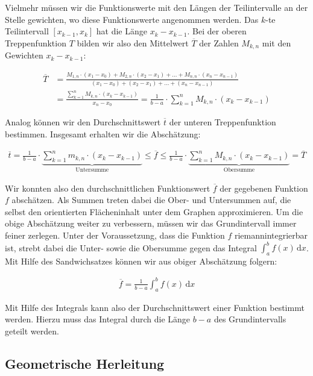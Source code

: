 \documentclass[fontsize=9pt,
               parskip=half-,
               DIV=14,
               listof=chapterentry,
               tocflat]{scrbook}
\begin{document}
Vielmehr müssen wir die Funktionswerte mit den Längen der Teilintervalle an der Stelle gewichten, wo diese Funktionswerte angenommen werden. Das $k$-te Teilintervall $[x_{k-1},x_{k}]$ hat die Länge $x_{k}-x_{k-1}$. Bei der oberen Treppenfunktion $T$ bilden wir also den Mittelwert ${\overline {T}}$ der Zahlen $M_{k,n}$ mit den Gewichten $x_{k}-x_{k-1}$:

\begin{align*}
{\overline {T}}&={\frac {M_{1,n}\cdot (x_{1}-x_{0})+M_{2,n}\cdot (x_{2}-x_{1})+\ldots +M_{n,n}\cdot (x_{n}-x_{n-1})}{(x_{1}-x_{0})+(x_{2}-x_{1})+\ldots +(x_{n}-x_{n-1})}}\\[0.5em]&={\frac {\sum _{k=1}^{n}M_{k,n}\cdot (x_{k}-x_{k-1})}{x_{n}-x_{0}}}={\frac {1}{b-a}}\cdot \sum _{k=1}^{n}M_{k,n}\cdot (x_{k}-x_{k-1})
\end{align*}

Analog können wir den Durchschnittswert ${\overline {t}}$ der unteren Treppenfunktion bestimmen. Insgesamt erhalten wir die Abschätzung:

\begin{align*}
{\overline {t}}={\frac {1}{b-a}}\cdot \underbrace {\sum _{k=1}^{n}m_{k,n}\cdot (x_{k}-x_{k-1})} _{\text{Untersumme}}\leq {\overline {f}}\leq {\frac {1}{b-a}}\cdot \underbrace {\sum _{k=1}^{n}M_{k,n}\cdot (x_{k}-x_{k-1})} _{\text{Obersumme}}={\overline {T}}
\end{align*}

Wir konnten also den durchschnittlichen Funktionswert ${\overline {f}}$ der gegebenen Funktion $f$ abschätzen. Als Summen treten dabei die Ober- und Untersummen auf, die selbst den orientierten Flächeninhalt unter dem Graphen approximieren. Um die obige Abschätzung weiter zu verbessern, müssen wir das Grundintervall immer feiner zerlegen. Unter der Voraussetzung, dass die Funktion $f$ riemannintegrierbar ist, strebt dabei die Unter- sowie die Obersumme gegen das Integral $\int _{a}^{b}f(x)\,\mathrm {d} x$. Mit Hilfe des Sandwichsatzes können wir aus obiger Abschätzung folgern:

\begin{align*}
{\overline {f}}={\frac {1}{b-a}}\int _{a}^{b}f(x)\,\mathrm {d} x
\end{align*}

Mit Hilfe des Integrals kann also der Durchschnittswert einer Funktion bestimmt werden. Hierzu muss das Integral durch die Länge $b-a$ des Grundintervalls geteilt werden.

\subsection{Geometrische Herleitung}
\end{document}
